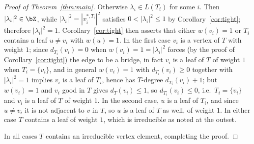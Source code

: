 \begin{proof}[Proof of Theorem~\ref{thm:main}]
Otherwise $\lambda_i\in L(T_i)$ for some $i$. Then $|\lambda_i|^2\in\bZ$, while
$|\lambda_i|^2=|v_i^{*,T_i}|^2$ satisfies $0<|\lambda_i|^2\leq1$ by
Corollary~\ref{cor:tight}; therefore $|\lambda_i|^2=1$. Corollary~\ref{cor:tight}
then asserts that either $w(v_i)=1$ or $T_i$ contains a leaf $u\neq v_i$ with
$w(u)=1$. In the first case $v_i$ is a vertex of $T$ with weight $1$; since
$d_{T_i}(v_i)=0$ when $w(v_i)=1=|\lambda_i|^2$ forces (by the proof of
Corollary~\ref{cor:tight}) the edge to be a bridge, in fact $v_i$ is a leaf of
$T$ of weight $1$ when $T_i=\{v_i\}$, and in general $w(v_i)=1$ with
$d_{T_i}(v_i)\geq 0$ together with $|\lambda_i|^2=1$ implies $v_i$ is a leaf of
$T_i$, hence has $T$-degree $d_{T_i}(v_i)+1$; but $w(v_i)=1$ and $v_i$ good in
$T$ gives $d_T(v_i)\le1$, so $d_{T_i}(v_i)\le0$, i.e.\ $T_i=\{v_i\}$ and $v_i$ is
a leaf of $T$ of weight $1$. In the second case, $u$ is a leaf of $T_i$, and
since $u\neq v_i$ it is not adjacent to $v$ in $T$, so $u$ is a leaf of $T$ as
well, of weight $1$. In either case $T$ contains a leaf of weight $1$, which is
irreducible as noted at the outset.

In all cases $T$ contains an irreducible vertex element, completing the proof.
\end{proof}

